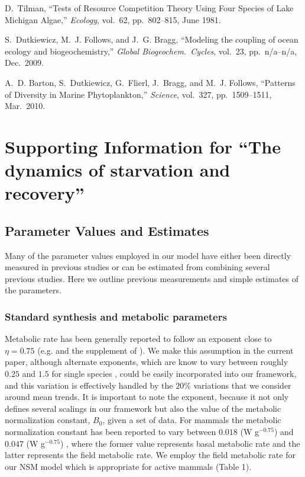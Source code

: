 \documentclass[twocolumn,preprintnumbers,amsmath,amssymb,superscriptaddress]{revtex4}
\begin{document}
{\begin{thebibliography}{10}
 D.~Tilman, ``{Tests of Resource Competition Theory Using
    Four Species of Lake Michigan Algae},'' {\em Ecology}, vol.~62,
  pp.~802--815, June 1981.

 S.~Dutkiewicz, M.~J. Follows, and J.~G. Bragg,
  ``{Modeling the coupling of ocean ecology and biogeochemistry},'' {\em
    Global Biogeochem.\ Cycles}, vol.~23, pp.~n/a--n/a, Dec.\ 2009.

 A.~D. Barton, S.~Dutkiewicz, G.~Flierl, J.~Bragg, and
  M.~J. Follows, ``{Patterns of Diversity in Marine Phytoplankton},'' {\em
    Science}, vol.~327, pp.~1509--1511, Mar.\ 2010.

\end{thebibliography}
}






\clearpage





 
\section*{Supporting Information for ``The dynamics of starvation and recovery''}%


\subsection*{Parameter Values and Estimates}

Many of the parameter values employed in our model have either been directly measured in previous studies or can be estimated from combining several previous studies. Here we outline previous measurements and simple estimates of the parameters. 

\subsubsection*{Standard synthesis and metabolic parameters}

Metabolic rate has been generally reported to follow an exponent close to
$\eta=0.75$ (e.g. \cite{supp:West:2001bv,supp:moses2008rmo} and the
supplement of \cite{supp:hou}). We make this assumption in the current paper,
although alternate exponents, which are know to vary between roughly $0.25$
and $1.5$ for single species \cite{supp:moses2008rmo}, could be easily
incorporated into our framework, and this variation is effectively handled by
the $20\%$ variations that we consider around mean trends. It is important to
note the exponent, because it not only defines several scalings in our
framework but also the value of the metabolic normalization constant,
$B_{0}$, given a set of data.  For mammals the metabolic normalization
constant has been reported to vary between $0.018$ (W g$^{-0.75}$) and
$0.047$ (W g$^{-0.75}$) \cite{supp:hou,supp:West:2001bv}, where the former value
represents basal metabolic rate and the latter represents the field metabolic
rate. We employ the field metabolic rate for our NSM model which is
appropriate for active mammals (Table 1).
\end{document}
